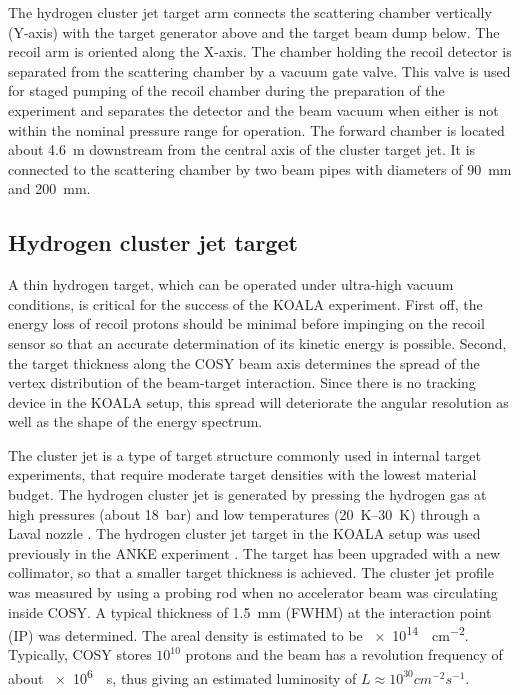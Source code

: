 \documentclass[number,5p]{elsarticle}
\begin{document}
The hydrogen cluster jet target arm connects the scattering chamber vertically (Y-axis) with the target generator above and the target beam dump below.
The recoil arm is oriented along the X-axis.
The chamber holding the recoil detector is separated from the scattering chamber by a vacuum gate valve.
This valve is used for staged pumping of the recoil chamber during the
preparation of the experiment and separates the detector and the beam vacuum when
either is not within the nominal pressure range for operation.
The forward chamber is located about \SI{4.6}{\meter} downstream from the
central axis of the cluster target jet.
It is connected to the scattering chamber by two beam pipes with diameters of \SI{90}{\mm} and \SI{200}{\mm}.
\subsection{Hydrogen cluster jet target}
\label{sec:target}

A thin hydrogen target, which can be operated under ultra-high vacuum
conditions, is critical for the success of the KOALA experiment.
First off, the energy loss of recoil protons should be minimal before impinging
on the recoil sensor so that an accurate determination of its kinetic energy is possible.
Second, the target thickness along the COSY beam axis determines
the spread of the vertex distribution of the beam-target interaction.
Since there is no tracking device in the KOALA setup, this spread will deteriorate the
angular resolution as well as the shape of the energy spectrum.

The cluster jet is a type of target structure commonly used in internal target experiments, that require moderate
target densities with the lowest material budget.
The hydrogen cluster jet is generated by pressing the hydrogen gas at high
pressures (about \SI{18}{\bar}) and low temperatures (\SIrange{20}{30}{\K})
through a Laval nozzle \cite{cluster_target}. 
The hydrogen cluster jet target in the KOALA setup was used previously in the ANKE experiment
\cite{cluster_target_new}.
The target has been upgraded with a new collimator, so that a smaller target thickness is achieved.
The cluster jet profile was measured by using a probing rod when no accelerator beam was circulating inside COSY.
A typical thickness of \SI{1.5}{\mm} (FWHM) at the interaction point (IP) was determined.
The areal density is estimated to be \SI{e14}{\atom\per\cm\squared}.
Typically, COSY stores $10^{10}$ protons and the beam has a revolution frequency
of about \SI[per-mode=power]{e6}{\per\second}, thus giving an estimated luminosity of $L \approx 10^{30}\si{cm^{-2}s^{-1}}$.
\end{document}
